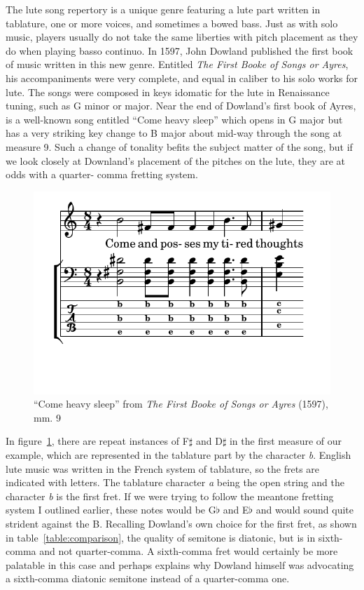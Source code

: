 The lute song repertory is a unique genre featuring a lute part written in tablature, one or more
voices, and sometimes a bowed bass.  Just as with solo music, players usually do not take the same
liberties with pitch placement as they do when playing basso continuo.  In 1597, John Dowland published the
first book of music written in this new genre. Entitled \textit{The First Booke of Songs or Ayres},
his accompaniments were very complete, and equal in caliber to his solo works for lute.  The songs
were composed in keys idomatic for the lute in Renaissance tuning, such as G minor or major. Near the
end of Dowland's first book of Ayres, is a well-known song entitled ``Come heavy sleep'' which opens
in G major but has a very striking key change to B major about mid-way through the song at measure 9.
Such a change of tonality befits the subject matter of the song, but if we look closely at
Downland's placement of the pitches on the lute, they are at odds with a quarter- comma fretting
system.
\begin{figure}[h]
\centering
\includegraphics{examples/come.pdf}
\caption{``Come heavy sleep'' from \textit{The First Booke of Songs or Ayres} (1597), mm. 9}
\label{dowland-come}
\end{figure}
In figure~\ref{dowland-come}, there are repeat instances of F$\sharp$ and D$\sharp$ in the
first measure of our example, which are represented in the tablature part by the character
\textit{b}.  English lute music was written in the French system of tablature, so the
frets are indicated with letters.  The tablature character \textit{a} being the open
string and the character \textit{b} is the first fret.  If we were trying to follow the
meantone fretting system I outlined earlier, these notes would be G$\flat$ and E$\flat$
and would sound quite strident against the B.  Recalling Dowland's own choice for the
first fret, as shown in table~\ref{table:comparison}, the quality of semitone is diatonic,
but is in sixth-comma and not quarter-comma.  A sixth-comma fret would certainly be more
palatable in this case and perhaps explains why Dowland himself was advocating a sixth-comma
diatonic semitone instead of a quarter-comma one.

